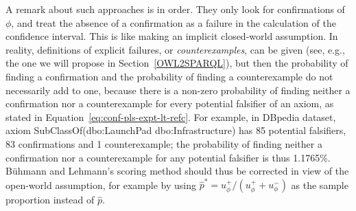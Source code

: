 \documentclass{llncs}
\begin{document}

A remark about such approaches is in order. They only look for confirmations of $\phi$, and treat
the absence of a confirmation as a failure in the calculation of the confidence interval.
This is like making an implicit closed-world assumption. In reality, definitions
of explicit failures, or \emph{counterexamples}, can be given (see, e.g.,
the one we will propose in Section~\ref{OWL2SPARQL}), but then the probability
of finding a confirmation and the probability of finding a counterexample do not necessarily add to one,
because there is a non-zero probability of finding neither a confirmation nor a counterexample
for every potential falsifier of an axiom, as stated in Equation~\ref{eq:conf-pls-expt-lt-refc}.
For example, in DBpedia dataset, axiom
\textsf{SubClassOf}(\textsf{dbo:LaunchPad} \textsf{dbo:Infrastructure}) has 85 potential
falsifiers, 83 confirmations and 1 counterexample; the probability of finding neither a
confirmation nor a counterexample for any potential falsifier is thus 1.1765\%.
B\"uhmann and Lehmann's scoring method should thus be
corrected in view of the open-world assumption, for example by using
$\hat{p}^* = u_\phi^+/(u_\phi^+ + u_\phi^-)$ as the sample proportion instead of $\hat{p}$.
\end{document}
